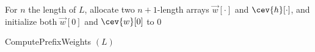 \begin{algorithm}
	For $n$ the length of $L$, allocate two $n+1$-length arrays $\vec{w}[\cdot]$ and $\cev{h}[\cdot]$, and initialize both $\vec{w}[0]$ and $\cev{w}[0]$ to $0$\;
	\;
	\caption{ComputePrefixWeights $(L)$}
	\label{algo:prefix_weights}
\end{algorithm}

%
%
%
%
%
%
